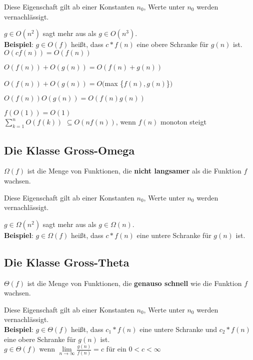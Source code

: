 \documentclass[12pt]{article}
\begin{document}
Diese Eigenschaft gilt ab einer Konstanten $n_0$, Werte unter $n_0$ werden vernachlässigt.

$g \in O(n^2)$ sagt mehr aus als $g \in O(n^3)$.\\

\textbf{Beispiel}: $g \in O(f)$ heißt, dass $c * f(n)$ eine obere Schranke für $g(n)$ ist.\\

$O(cf(n)) = O(f(n))$

$O(f(n)) + O(g(n)) = O(f(n) + g(n))$

$O(f(n)) + O(g(n)) = O($max \{$f(n), g(n)$\}$)$

$O(f(n))O(g(n)) = O(f(n)g(n))$

$f(O(1)) = O(1)$\\

$\sum_{k=1}^n O(f(k))$ $\subseteq O(nf(n))$, wenn $f(n)$ monoton steigt

\subsection{Die Klasse Gross-Omega}

$\Omega(f)$ ist die Menge von Funktionen, die \textbf{nicht langsamer} als die Funktion $f$ wachsen.

Diese Eigenschaft gilt ab einer Konstanten $n_0$, Werte unter $n_0$ werden vernachlässigt.

$g \in \Omega(n^2)$ sagt mehr aus als $g \in \Omega(n)$.\\

\textbf{Beispiel}: $g \in \Omega(f)$ heißt, dass $c * f(n)$ eine untere Schranke für $g(n)$ ist.\\

\subsection{Die Klasse Gross-Theta}

$\Theta(f)$ ist die Menge von Funktionen, die \textbf{genauso schnell} wie die Funktion $f$ wachsen.

Diese Eigenschaft gilt ab einer Konstanten $n_0$, Werte unter $n_0$ werden vernachlässigt.\\

\textbf{Beispiel}: $g \in \Theta(f)$ heißt, dass $c_1 * f(n)$ eine untere Schranke und $c_2 * f(n)$ eine obere Schranke für $g(n)$ ist.\\

$g \in \Theta(f)$ wenn \(\lim\limits_{n \to \infty}\frac{g(n)}{f(n)}=c\) für ein $0 < c < \infty$
\end{document}
